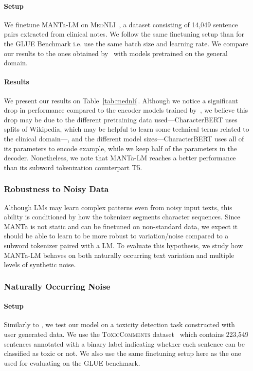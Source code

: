 \paragraph{Setup} We finetune MANTa-LM on \textsc{MedNLI}~\cite{romanov-shivade-2018-lessons}, a dataset consisting of 14,049 sentence pairs extracted from clinical notes. We follow the same finetuning setup than for the GLUE Benchmark i.e. use the same batch size and learning rate. We compare our results to the ones obtained by~\citet{el-boukkouri-etal-2020-characterbert} with models pretrained on the general domain.

\paragraph{Results} We present our results on Table~\ref{tab:mednli}. Although we notice a significant drop in performance compared to the encoder models trained by~\cite{el-boukkouri-etal-2020-characterbert}, we believe this drop may be due to the different pretraining data used---CharacterBERT uses splits of Wikipedia, which may be helpful to learn some technical terms related to the clinical domain---, and the different model sizes---CharacterBERT uses all of its parameters to encode example, while we keep half of the parameters in the decoder. Nonetheless, we note that MANTa-LM reaches a better performance than its subword tokenization counterpart T5.

\subsubsection{Robustness to Noisy Data}
Although LMs may learn complex patterns even from noisy input texts, this ability is conditioned by how the tokenizer segments character sequences. Since MANTa is not static and can be finetuned on non-standard data, we expect it should be able to learn to be more robust to variation/noise compared to a subword tokenizer paired with a LM. To evaluate this hypothesis, we study how MANTa-LM behaves on both naturally occurring text variation and multiple levels of synthetic noise.

\subsubsection{Naturally Occurring Noise}
\paragraph{Setup} Similarly to \citet{tay2021charformer}, we test our model on a toxicity detection task constructed with user generated data. We use the \textsc{ToxicComments}{} dataset~\cite{wulczyn2017ex} which contains 223,549 sentences annotated with a binary label indicating whether each sentence can be classified as toxic or not. We also use the same finetuning setup here as the one used for evaluating on the GLUE benchmark. 

